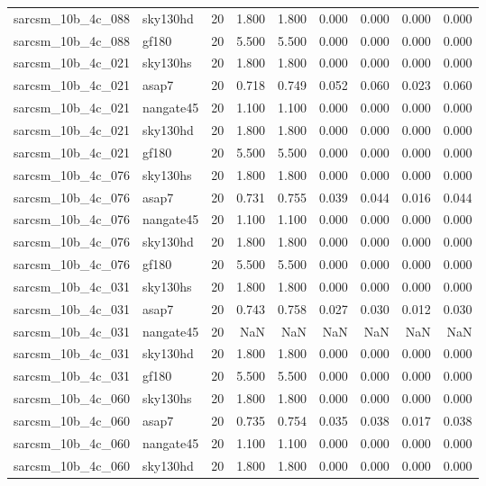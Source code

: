 \begin{tabular}{llrrrrrrr}
sarcsm\_10b\_4c\_088 & sky130hd & 20 & 1.800 & 1.800 & 0.000 & 0.000 & 0.000 & 0.000 \\
sarcsm\_10b\_4c\_088 & gf180 & 20 & 5.500 & 5.500 & 0.000 & 0.000 & 0.000 & 0.000 \\
sarcsm\_10b\_4c\_021 & sky130hs & 20 & 1.800 & 1.800 & 0.000 & 0.000 & 0.000 & 0.000 \\
sarcsm\_10b\_4c\_021 & asap7 & 20 & 0.718 & 0.749 & 0.052 & 0.060 & 0.023 & 0.060 \\
sarcsm\_10b\_4c\_021 & nangate45 & 20 & 1.100 & 1.100 & 0.000 & 0.000 & 0.000 & 0.000 \\
sarcsm\_10b\_4c\_021 & sky130hd & 20 & 1.800 & 1.800 & 0.000 & 0.000 & 0.000 & 0.000 \\
sarcsm\_10b\_4c\_021 & gf180 & 20 & 5.500 & 5.500 & 0.000 & 0.000 & 0.000 & 0.000 \\
sarcsm\_10b\_4c\_076 & sky130hs & 20 & 1.800 & 1.800 & 0.000 & 0.000 & 0.000 & 0.000 \\
sarcsm\_10b\_4c\_076 & asap7 & 20 & 0.731 & 0.755 & 0.039 & 0.044 & 0.016 & 0.044 \\
sarcsm\_10b\_4c\_076 & nangate45 & 20 & 1.100 & 1.100 & 0.000 & 0.000 & 0.000 & 0.000 \\
sarcsm\_10b\_4c\_076 & sky130hd & 20 & 1.800 & 1.800 & 0.000 & 0.000 & 0.000 & 0.000 \\
sarcsm\_10b\_4c\_076 & gf180 & 20 & 5.500 & 5.500 & 0.000 & 0.000 & 0.000 & 0.000 \\
sarcsm\_10b\_4c\_031 & sky130hs & 20 & 1.800 & 1.800 & 0.000 & 0.000 & 0.000 & 0.000 \\
sarcsm\_10b\_4c\_031 & asap7 & 20 & 0.743 & 0.758 & 0.027 & 0.030 & 0.012 & 0.030 \\
sarcsm\_10b\_4c\_031 & nangate45 & 20 & NaN & NaN & NaN & NaN & NaN & NaN \\
sarcsm\_10b\_4c\_031 & sky130hd & 20 & 1.800 & 1.800 & 0.000 & 0.000 & 0.000 & 0.000 \\
sarcsm\_10b\_4c\_031 & gf180 & 20 & 5.500 & 5.500 & 0.000 & 0.000 & 0.000 & 0.000 \\
sarcsm\_10b\_4c\_060 & sky130hs & 20 & 1.800 & 1.800 & 0.000 & 0.000 & 0.000 & 0.000 \\
sarcsm\_10b\_4c\_060 & asap7 & 20 & 0.735 & 0.754 & 0.035 & 0.038 & 0.017 & 0.038 \\
sarcsm\_10b\_4c\_060 & nangate45 & 20 & 1.100 & 1.100 & 0.000 & 0.000 & 0.000 & 0.000 \\
sarcsm\_10b\_4c\_060 & sky130hd & 20 & 1.800 & 1.800 & 0.000 & 0.000 & 0.000 & 0.000 \\

\end{tabular}
